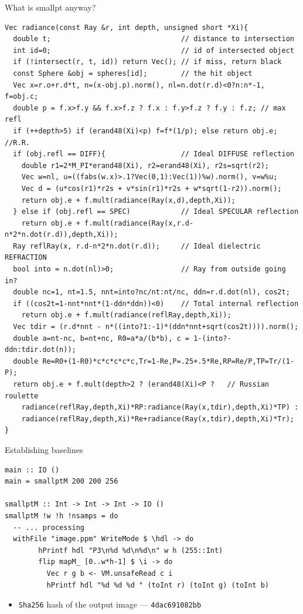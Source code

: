 \documentclass[8pt]{beamer}
\newcommand{\raw}[1]{\texttt{#1}}
\begin{document}
\begin{frame}[fragile]{What is smallpt anyway?}
\footnotesize
\begin{verbatim}
Vec radiance(const Ray &r, int depth, unsigned short *Xi){ 
  double t;                               // distance to intersection 
  int id=0;                               // id of intersected object 
  if (!intersect(r, t, id)) return Vec(); // if miss, return black 
  const Sphere &obj = spheres[id];        // the hit object 
  Vec x=r.o+r.d*t, n=(x-obj.p).norm(), nl=n.dot(r.d)<0?n:n*-1, f=obj.c; 
  double p = f.x>f.y && f.x>f.z ? f.x : f.y>f.z ? f.y : f.z; // max refl 
  if (++depth>5) if (erand48(Xi)<p) f=f*(1/p); else return obj.e; //R.R. 
  if (obj.refl == DIFF){                  // Ideal DIFFUSE reflection 
    double r1=2*M_PI*erand48(Xi), r2=erand48(Xi), r2s=sqrt(r2); 
    Vec w=nl, u=((fabs(w.x)>.1?Vec(0,1):Vec(1))%w).norm(), v=w%u; 
    Vec d = (u*cos(r1)*r2s + v*sin(r1)*r2s + w*sqrt(1-r2)).norm(); 
    return obj.e + f.mult(radiance(Ray(x,d),depth,Xi)); 
  } else if (obj.refl == SPEC)            // Ideal SPECULAR reflection 
    return obj.e + f.mult(radiance(Ray(x,r.d-n*2*n.dot(r.d)),depth,Xi)); 
  Ray reflRay(x, r.d-n*2*n.dot(r.d));     // Ideal dielectric REFRACTION 
  bool into = n.dot(nl)>0;                // Ray from outside going in? 
  double nc=1, nt=1.5, nnt=into?nc/nt:nt/nc, ddn=r.d.dot(nl), cos2t; 
  if ((cos2t=1-nnt*nnt*(1-ddn*ddn))<0)    // Total internal reflection 
    return obj.e + f.mult(radiance(reflRay,depth,Xi)); 
  Vec tdir = (r.d*nnt - n*((into?1:-1)*(ddn*nnt+sqrt(cos2t)))).norm(); 
  double a=nt-nc, b=nt+nc, R0=a*a/(b*b), c = 1-(into?-ddn:tdir.dot(n)); 
  double Re=R0+(1-R0)*c*c*c*c*c,Tr=1-Re,P=.25+.5*Re,RP=Re/P,TP=Tr/(1-P); 
  return obj.e + f.mult(depth>2 ? (erand48(Xi)<P ?   // Russian roulette 
    radiance(reflRay,depth,Xi)*RP:radiance(Ray(x,tdir),depth,Xi)*TP) : 
    radiance(reflRay,depth,Xi)*Re+radiance(Ray(x,tdir),depth,Xi)*Tr); 
} 
\end{verbatim}
\end{frame}

\begin{frame}[fragile]{Establishing baselines}
\begin{verbatim}
main :: IO ()
main = smallptM 200 200 256

smallptM :: Int -> Int -> Int -> IO ()
smallptM !w !h !nsamps = do
  -- ... processing
  withFile "image.ppm" WriteMode $ \hdl -> do
        hPrintf hdl "P3\n%d %d\n%d\n" w h (255::Int)
        flip mapM_ [0..w*h-1] $ \i -> do
          Vec r g b <- VM.unsafeRead c i
          hPrintf hdl "%d %d %d " (toInt r) (toInt g) (toInt b)
\end{verbatim}

\pause
\begin{itemize}
\item \raw{Sha256} hash of the output image --- \raw{4dac691082bb}
\end{itemize}
\end{frame}
\end{document}
